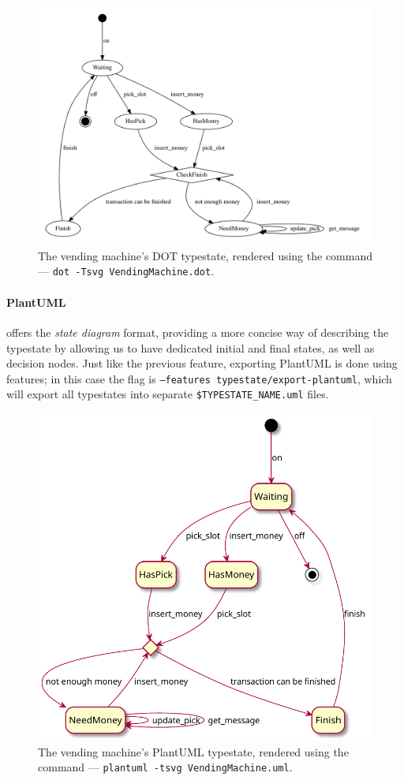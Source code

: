 \begin{figure}
    \centering
    \includegraphics[width=\linewidth]{Chapters/Figures/C4/VendingMachine.dot.pdf}
    \caption{The vending machine's DOT typestate, rendered using the command --- \texttt{dot -Tsvg VendingMachine.dot}.}
    \label{fig:vending-machine-typestate-dot}
\end{figure}

\paragraph{PlantUML} offers the \emph{state diagram} format, providing a more concise way of describing the typestate
by allowing us to have dedicated initial and final states, as well as decision nodes.
Just like the previous feature, exporting PlantUML is done using features;
in this case the flag is \texttt{--features typestate/export-plantuml},
which will export all typestates into separate \texttt{\$TYPESTATE\_NAME.uml} files.


\begin{figure}
    \centering
    \includegraphics[width=0.5\linewidth]{Chapters/Figures/C4/VendingMachine.uml.pdf}
    \caption{The vending machine's PlantUML typestate, rendered using the command --- \texttt{plantuml -tsvg VendingMachine.uml}.}
    \label{fig:vending-machine-typestate-uml}
\end{figure}

